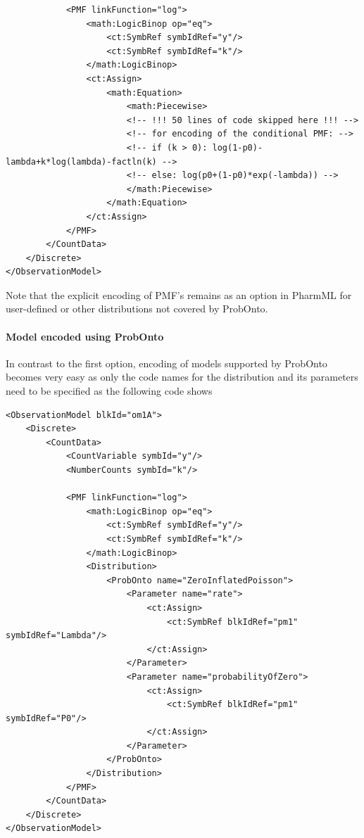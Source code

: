 {\begin{lstlisting}
            <PMF linkFunction="log">
                <math:LogicBinop op="eq">
                    <ct:SymbRef symbIdRef="y"/>
                    <ct:SymbRef symbIdRef="k"/>
                </math:LogicBinop>
                <ct:Assign>
                    <math:Equation>
                        <math:Piecewise>
                        <!-- !!! 50 lines of code skipped here !!! -->
                        <!-- for encoding of the conditional PMF: -->
                        <!-- if (k > 0): log(1-p0)-lambda+k*log(lambda)-factln(k) -->
                        <!-- else: log(p0+(1-p0)*exp(-lambda)) -->
                        </math:Piecewise>
                    </math:Equation>
                </ct:Assign>
            </PMF>
        </CountData>
    </Discrete>
</ObservationModel>
\end{lstlisting}
Note that \marginpar{\HandCuffLeft} the explicit encoding of PMF's remains
as an option in PharmML for user-defined or other distributions not covered by ProbOnto.
        
\paragraph{Model encoded using ProbOnto}
In contrast to the first option, encoding of models supported by ProbOnto
becomes very easy as only the code names for the distribution and its parameters 
need to be specified as the following code shows

\lstset{language=XML}
\begin{lstlisting}
<ObservationModel blkId="om1A">
    <Discrete>
        <CountData>
            <CountVariable symbId="y"/>
            <NumberCounts symbId="k"/>
            
            <PMF linkFunction="log">
                <math:LogicBinop op="eq">
                    <ct:SymbRef symbIdRef="y"/>
                    <ct:SymbRef symbIdRef="k"/>
                </math:LogicBinop>
                <Distribution>
                    <ProbOnto name="ZeroInflatedPoisson">
                        <Parameter name="rate">
                            <ct:Assign>
                                <ct:SymbRef blkIdRef="pm1" symbIdRef="Lambda"/>
                            </ct:Assign>
                        </Parameter>
                        <Parameter name="probabilityOfZero">
                            <ct:Assign>
                                <ct:SymbRef blkIdRef="pm1" symbIdRef="P0"/>
                            </ct:Assign>
                        </Parameter>
                    </ProbOnto>
                </Distribution>
            </PMF>
        </CountData>
    </Discrete>
</ObservationModel>\end{lstlisting}

}
